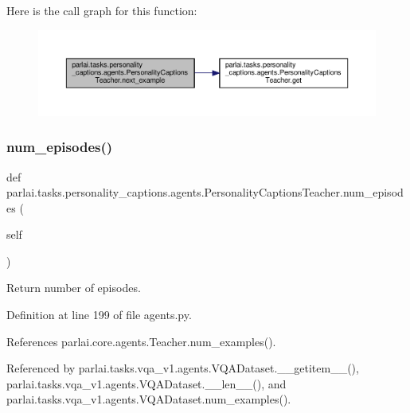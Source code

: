 Here is the call graph for this function\+:
\nopagebreak
\begin{figure}[H]
\begin{center}
\leavevmode
\includegraphics[width=350pt]{classparlai_1_1tasks_1_1personality__captions_1_1agents_1_1PersonalityCaptionsTeacher_ace67289d386996e9dab37cc9fcca55b4_cgraph}
\end{center}
\end{figure}
\mbox{\label{classparlai_1_1tasks_1_1personality__captions_1_1agents_1_1PersonalityCaptionsTeacher_a4d6d5ae65fc9d19ad7d847dbfd106427}} 
\subsubsection{\texorpdfstring{num\+\_\+episodes()}{num\_episodes()}}
{\footnotesize\ttfamily def parlai.\+tasks.\+personality\+\_\+captions.\+agents.\+Personality\+Captions\+Teacher.\+num\+\_\+episodes (\begin{DoxyParamCaption}\item[{}]{self }\end{DoxyParamCaption})}

\begin{DoxyVerb}Return number of episodes.\end{DoxyVerb}
 

Definition at line 199 of file agents.\+py.



References parlai.\+core.\+agents.\+Teacher.\+num\+\_\+examples().



Referenced by parlai.\+tasks.\+vqa\+\_\+v1.\+agents.\+V\+Q\+A\+Dataset.\+\_\+\+\_\+getitem\+\_\+\+\_\+(), parlai.\+tasks.\+vqa\+\_\+v1.\+agents.\+V\+Q\+A\+Dataset.\+\_\+\+\_\+len\+\_\+\+\_\+(), and parlai.\+tasks.\+vqa\+\_\+v1.\+agents.\+V\+Q\+A\+Dataset.\+num\+\_\+examples().

